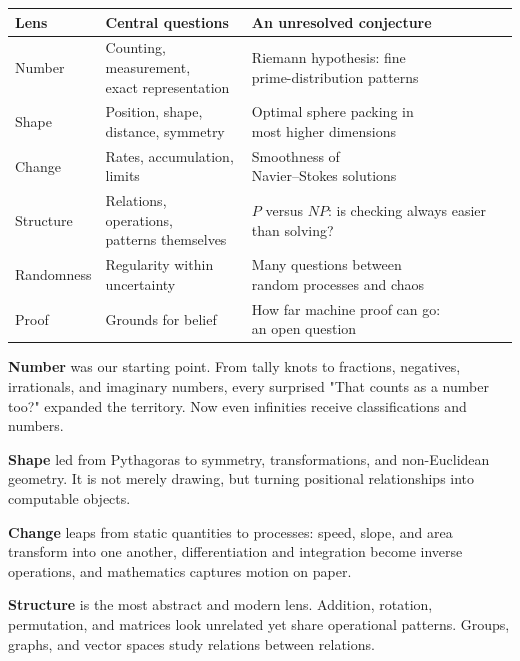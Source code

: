 \begin{center}
\begin{tabular}{lll}
\toprule
Lens & Central questions & An unresolved conjecture \\
\midrule
Number & \shortstack[l]{Counting, measurement,\\exact representation} & \shortstack[l]{Riemann hypothesis: fine\\prime-distribution patterns}\\
Shape & \shortstack[l]{Position, shape,\\distance, symmetry} & \shortstack[l]{Optimal sphere packing in\\most higher dimensions}\\
Change & \shortstack[l]{Rates, accumulation,\\limits} & \shortstack[l]{Smoothness of\\Navier--Stokes solutions}\\
Structure & \shortstack[l]{Relations, operations,\\patterns themselves} & \shortstack[l]{$P$ versus $NP$: is checking\\always easier than solving?}\\
Randomness & \shortstack[l]{Regularity within\\uncertainty} & \shortstack[l]{Many questions between\\random processes and chaos}\\
Proof & Grounds for belief & \shortstack[l]{How far machine proof can go:\\an open question}\\
\bottomrule
\end{tabular}
\end{center}

\textbf{Number} was our starting point. From tally knots to fractions, negatives, irrationals, and imaginary numbers, every surprised "That counts as a number too?" expanded the territory. Now even infinities receive classifications and numbers.

\textbf{Shape} led from Pythagoras to symmetry, transformations, and non-Euclidean geometry. It is not merely drawing, but turning positional relationships into computable objects.

\textbf{Change} leaps from static quantities to processes: speed, slope, and area transform into one another, differentiation and integration become inverse operations, and mathematics captures motion on paper.

\textbf{Structure} is the most abstract and modern lens. Addition, rotation, permutation, and matrices look unrelated yet share operational patterns. Groups, graphs, and vector spaces study relations between relations.

